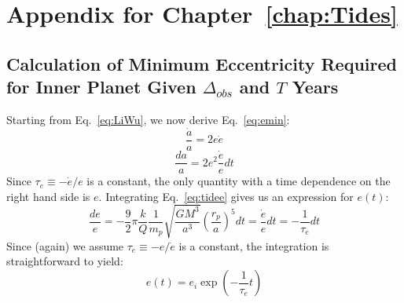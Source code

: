 \appendix
\chapter{Appendix for Chapter~\ref{chap:Tides}}
\section{Calculation of Minimum Eccentricity Required for Inner Planet Given $\Delta_{obs}$ and $T$ Years}
\label{app:min_e}

Starting from Eq.~\ref{eq:LiWu}, we now derive Eq.~\ref{eq:emin}:
\begin{equation*}
\frac{\dot{a}}{a} = 2e\dot{e}
\end{equation*}
\begin{equation}
\frac{da}{a} = 2e^2\frac{\dot{e}}{e}dt
\label{eq:daa}
\end{equation}
Since $\tau_e \equiv - \dot{e}/e$ is a constant, the only quantity with a time dependence on the right hand side is $e$.  
Integrating Eq.~\ref{eq:tidee} gives us an expression for $e(t)$:
\begin{equation*}
\frac{de}{e} = -\frac{9}{2}\pi \frac{k}{Q} \frac{1}{m_p} \sqrt{\frac{GM^3}{a^3}} \left(\frac{r_p}{a} \right)^5 dt =  \frac{\dot{e}}{e} dt  = -\frac{1}{\tau_e} dt
\end{equation*}
Since (again) we assume $\tau_e \equiv - e/\dot{e}$ is a constant, the integration is straightforward to yield:
\begin{equation}
e(t) = e_i \exp\left(-\frac{1}{\tau_e} t \right)
\label{eq:et}
\end{equation}

